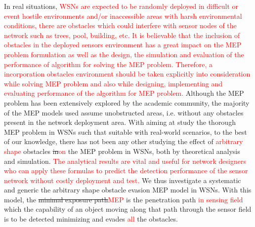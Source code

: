 \documentclass[final]{elsarticle}
\begin{document}
In real situations, \textcolor{red}{WSNs are expected to be randomly deployed in difficult or event hostile environments and/or inaccessible areas with harsh environmental conditions, there are obstacles which could interfere with sensor nodes of the network such as trees, pool, building, etc. It is believable that the inclusion of obstacles in the deployed sensors environment has a great impact on the MEP problem formulation as well as the design, the simulation and evaluation of the performance of algorithm for solving the MEP problem. Therefore, a incorporation obstacles environment should be taken explicitly into consideration while solving MEP problem and also while designing, implementing and evaluating performance of the algorithm for MEP problem.} Although the MEP problem has been extensively explored by the academic community, the majority of the MEP models used assume unobstructed areas, i.e. without any obstacles present in the network deployment area. With aiming at study the thorough MEP problem in WSNs such that suitable with real-world scenarios, to the best of our knowledge, there has not been any other studying the effect of \textcolor{red}{arbitrary shape} obstacles \sout{in}\textcolor{red}{on} the MEP problem in WSNs, both by theoretical analysis and simulation. \textcolor{red}{The analytical results are vital and useful for network designers who can apply these formulas to predict the detection performance of the sensor network without costly deployment and test.} We thus investigate a systematic and generic the arbitrary shape obstacle evasion MEP model in WSNs. With this model, the \sout{minimal exposure path}\textcolor{red}{MEP} is the penetration path \textcolor{red}{in sensing field} which the capability of an object moving along that path through the sensor field is to be detected minimizing and evades \textcolor{red}{all} the obstacles. 
\end{document}
